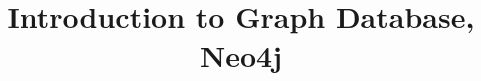\documentclass[xcolor=dvipsnames,compress,t,pdf,9pt]{beamer}
\title[\insertframenumber /\inserttotalframenumber]{Introduction to Graph Database, Neo4j}
\begin{document}
	\begin{frame}
	\titlepage
	\end{frame}
	
	
	
\end{document}
